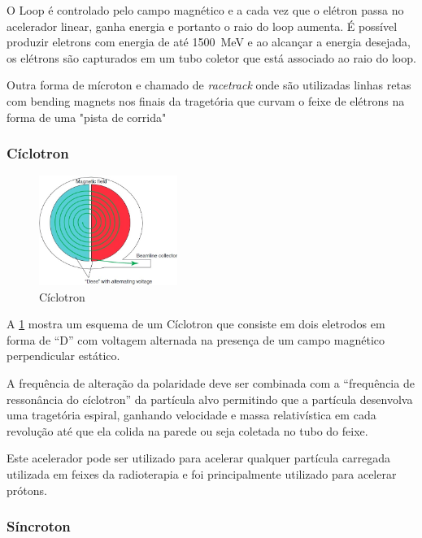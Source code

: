 \documentclass[11pt,a4paper]{article}
\begin{document}
    O Loop é controlado pelo campo magnético e a cada vez que o elétron passa no acelerador linear,  ganha energia e portanto o raio do loop aumenta.  É possível produzir eletrons com energia de até \qty{1500}{MeV} e ao alcançar a energia desejada, os elétrons são capturados em um tubo coletor que está associado ao raio do loop.

	Outra forma de mícroton e chamado de \textit{racetrack} onde são utilizadas linhas retas com bending magnets nos finais da tragetória que curvam o feixe de elétrons na forma de uma "pista de corrida"

\subsubsection*{Cíclotron}


            \begin{figure}
                \centering
                \includegraphics[width=0.4\textwidth]{Imagens/ciclotron.jpg}
                \caption{Cíclotron}
                \label{fig:ciclotron}
            \end{figure}


    A \ref{fig:ciclotron} mostra um esquema de um Cíclotron que consiste em dois eletrodos em forma de ``D'' com voltagem alternada na presença de um campo magnético perpendicular estático.

    A frequência de alteração da polaridade deve ser combinada com a ``frequência de ressonância do cíclotron'' da partícula alvo permitindo que a partícula desenvolva uma tragetória espiral, ganhando velocidade e massa relativística em cada revolução até que ela colida na parede ou seja coletada no tubo do feixe. 

    Este acelerador pode ser utilizado para acelerar qualquer partícula carregada utilizada em feixes da radioterapia e foi principalmente utilizado para acelerar prótons. 

\subsubsection*{Síncroton}
\end{document}
